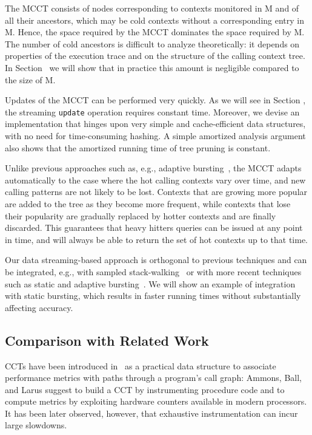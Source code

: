 The MCCT consists of nodes corresponding to contexts monitored in M and of all their ancestors, which may be cold contexts without a corresponding entry in M. Hence, the space required by the MCCT  dominates the space required by M. The number of cold ancestors is difficult to analyze theoretically: it depends on properties of the execution trace and on the structure of the calling context tree. In Section \missing\ we will show that in practice this amount is negligible compared to the size of M.

Updates of the MCCT can be performed very quickly. As we will see in Section \missing, the streaming {\tt update} operation requires constant time. Moreover, we devise an implementation that hinges upon very simple and cache-efficient data structures, with no need for time-consuming hashing. A simple amortized analysis argument also shows that the amortized running time of tree pruning is constant.

Unlike previous approaches such as, e.g., adaptive bursting~\cite{Zhuang06}, the MCCT adapts automatically to the case where the hot calling contexts vary over time, and new calling patterns are not likely to be lost. Contexts that are growing more popular are added to the tree as they become more frequent, while contexts that lose their popularity are gradually replaced by hotter contexts and are finally discarded. This guarantees that heavy hitters queries can be issued at any point in time, and will always be able to return the set of hot contexts up to that time.

Our data streaming-based approach is orthogonal to previous techniques and can be integrated, e.g., with sampled stack-walking~\cite{Arnold00,Whaley00} or with more recent techniques such as static and adaptive bursting~\cite{Zhuang06}. We will show an example of integration with static bursting, which results in faster running times without substantially affecting accuracy.


\subsection{Comparison with Related Work}

CCTs have been introduced in~\cite{Ammons97} as a practical data structure to associate performance metrics with paths through a program's call graph: Ammons, Ball, and Larus suggest to build a CCT by instrumenting procedure code and to compute metrics by exploiting hardware counters available in modern processors. It has been later observed, however, that exhaustive instrumentation can incur large slowdowns.

